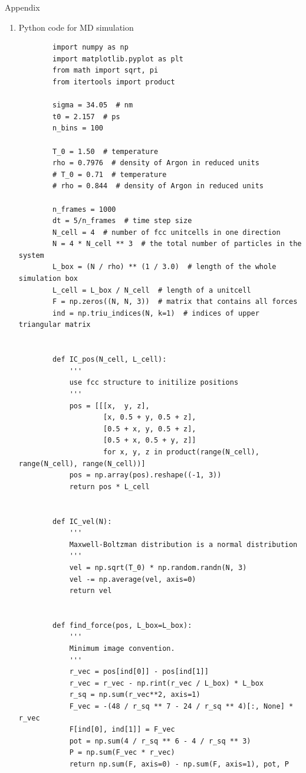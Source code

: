 \documentclass{article}
\begin{document}
\newpage
\begin{section}{Appendix}
\begin{enumerate}
	\item Python code for MD simulation
	\begin{verbatim}
        import numpy as np
        import matplotlib.pyplot as plt
        from math import sqrt, pi
        from itertools import product

        sigma = 34.05  # nm
        t0 = 2.157  # ps
        n_bins = 100

        T_0 = 1.50  # temperature
        rho = 0.7976  # density of Argon in reduced units
        # T_0 = 0.71  # temperature
        # rho = 0.844  # density of Argon in reduced units

        n_frames = 1000
        dt = 5/n_frames  # time step size
        N_cell = 4  # number of fcc unitcells in one direction
        N = 4 * N_cell ** 3  # the total number of particles in the system
        L_box = (N / rho) ** (1 / 3.0)  # length of the whole simulation box
        L_cell = L_box / N_cell  # length of a unitcell
        F = np.zeros((N, N, 3))  # matrix that contains all forces
        ind = np.triu_indices(N, k=1)  # indices of upper triangular matrix


        def IC_pos(N_cell, L_cell):
            '''
            use fcc structure to initilize positions
            '''
            pos = [[[x,  y, z],
                    [x, 0.5 + y, 0.5 + z],
                    [0.5 + x, y, 0.5 + z],
                    [0.5 + x, 0.5 + y, z]]
                    for x, y, z in product(range(N_cell), range(N_cell), range(N_cell))]
            pos = np.array(pos).reshape((-1, 3))
            return pos * L_cell


        def IC_vel(N):
            '''
            Maxwell-Boltzman distribution is a normal distribution
            '''
            vel = np.sqrt(T_0) * np.random.randn(N, 3)
            vel -= np.average(vel, axis=0)
            return vel


        def find_force(pos, L_box=L_box):
            '''
            Minimum image convention. 
            '''
            r_vec = pos[ind[0]] - pos[ind[1]]
            r_vec = r_vec - np.rint(r_vec / L_box) * L_box
            r_sq = np.sum(r_vec**2, axis=1)
            F_vec = -(48 / r_sq ** 7 - 24 / r_sq ** 4)[:, None] * r_vec
            F[ind[0], ind[1]] = F_vec
            pot = np.sum(4 / r_sq ** 6 - 4 / r_sq ** 3)
            P = np.sum(F_vec * r_vec)
            return np.sum(F, axis=0) - np.sum(F, axis=1), pot, P



\end{verbatim}
\end{enumerate}
\end{section}
\end{document}
